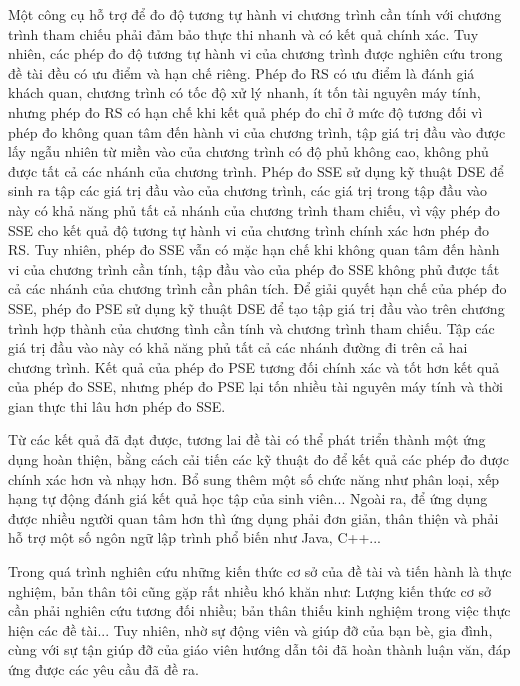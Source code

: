 Một công cụ hỗ trợ để đo độ tương tự hành vi chương trình cần tính
với chương trình tham chiếu phải đảm bảo thực thi nhanh và có kết quả 
chính xác. Tuy nhiên, các phép đo độ tương tự hành vi của chương trình 
được nghiên cứu trong đề tài đều có ưu điểm và hạn chế riêng. Phép đo RS có ưu điểm 
là đánh giá khách quan, chương trình có tốc độ xử lý nhanh, ít tốn 
tài nguyên máy tính, nhưng phép đo RS có hạn chế khi kết quả phép đo 
chỉ ở mức độ tương đối vì phép đo không quan tâm đến hành vi 
của chương trình, tập giá trị đầu vào được lấy ngẫu nhiên từ miền vào 
của chương trình có độ phủ không cao, không phủ được tất cả các nhánh 
của chương trình. Phép đo SSE sử dụng kỹ thuật DSE để sinh ra 
tập các giá trị đầu vào của chương trình, các giá trị 
trong tập đầu vào này có khả năng phủ tất cả nhánh của chương trình tham chiếu, 
vì vậy phép đo SSE cho kết quả độ tương tự hành vi của chương trình chính xác hơn 
phép đo RS. Tuy nhiên, phép đo SSE vẫn có mặc hạn chế khi không quan tâm đến 
hành vi của chương trình cần tính, tập đầu vào của phép đo SSE không phủ 
được tất cả các nhánh của chương trình cần phân tích.
Để giải quyết hạn chế của phép đo SSE, phép đo PSE sử dụng kỹ thuật DSE để 
tạo tập giá trị đầu vào trên chương trình hợp thành của chương tình cần tính và 
chương trình tham chiếu. Tập các giá trị đầu vào này có khả năng phủ tất cả 
các nhánh đường đi trên cả hai chương trình. Kết quả của phép đo PSE tương đối chính xác 
và tốt hơn kết quả của phép đo SSE, nhưng phép đo PSE lại tốn nhiều tài nguyên máy tính 
và thời gian thực thi lâu hơn phép đo SSE.

Từ các kết quả đã đạt được, tương lai đề tài có thể phát triển thành 
một ứng dụng hoàn thiện, bằng cách cải tiến các kỹ thuật đo để kết quả 
các phép đo được chính xác hơn và nhạy hơn. Bổ sung thêm một số chức năng 
như phân loại, xếp hạng tự động đánh giá kết quả học tập của sinh viên... 
Ngoài ra, để ứng dụng được nhiều người quan tâm hơn thì ứng dụng phải 
đơn giản, thân thiện và phải hỗ trợ một số ngôn ngữ lập trình phổ biến như Java, C++... 

Trong quá trình nghiên cứu những kiến thức cơ sở của đề tài và tiến hành là thực nghiệm, 
bản thân tôi cũng gặp rất nhiều khó khăn như: Lượng kiến thức cơ sở 
cần phải nghiên cứu tương đối nhiều; bản thân thiếu kinh nghiệm 
trong việc thực hiện các đề tài... Tuy nhiên, nhờ sự động viên và giúp 
đỡ của bạn bè, gia đình, cùng với sự tận giúp đỡ của giáo viên hướng dẫn tôi đã hoàn 
thành luận văn, đáp ứng được các yêu cầu đã đề ra.


